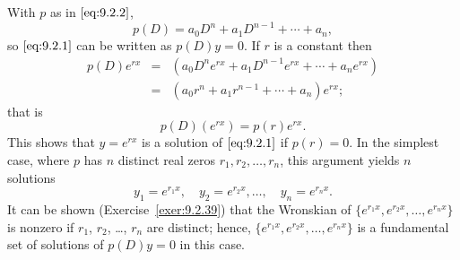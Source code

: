 \documentclass{ximera}
\begin{document}
With $p$ as in $\eqref{eq:9.2.2}$,
$$
p(D)=a_0D^n+a_1D^{n-1}+\cdots+a_n,
$$
so $\eqref{eq:9.2.1}$ can be written as $p(D)y=0$.  If $r$ is a constant
then
\begin{eqnarray*}
p(D)e^{rx}&=&\left(a_0D^ne^{rx}+a_1D^{n-1}e^{rx}+\cdots+a_ne^{rx}\right)\\
&=&(a_0r^n+a_1r^{n-1}+\cdots+a_n)e^{rx};
\end{eqnarray*}
that is
$$
p(D)(e^{rx})=p(r)e^{rx}.
$$
This shows that $y=e^{rx}$ is a solution of $\eqref{eq:9.2.1}$
if $p(r)=0$.
In the simplest case, where $p$ has $n$ distinct real zeros
$r_1, r_2,\dots, r_n$, this argument yields $n$ solutions
$$
y_1=e^{r_1x},\quad y_2=e^{r_2x},\dots,\quad y_n=e^{r_nx}.
$$
It can be shown (Exercise~\ref{exer:9.2.39}) that the Wronskian of
$\{e^{r_1x},e^{r_2x},\dots,e^{r_nx}\}$ is nonzero if
$r_1$, $r_2$, \dots, $r_n$ are distinct; hence,
$\{e^{r_1x},e^{r_2x},\dots,e^{r_nx}\}$
is a fundamental set of solutions of $p(D)y=0$ in this case.
\end{document}
